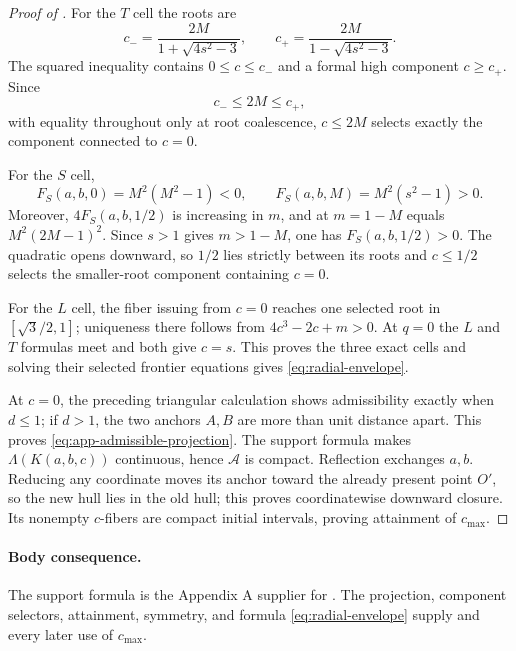 \begin{proof}[Proof of ]
For the $T$ cell the roots are
\[
 c_- =\frac{2M}{1+\sqrt{4s^2-3}},
 \qquad
 c_+ =\frac{2M}{1-\sqrt{4s^2-3}}.
\]
The squared inequality contains $0\le c\le c_-$ and a formal high component
$c\ge c_+$.  Since
\[
 c_-\le2M\le c_+,
\]
with equality throughout only at root coalescence, $c\le2M$ selects exactly
the component connected to $c=0$.

For the $S$ cell,
\[
 F_S(a,b,0)=M^2(M^2-1)<0,
 \qquad
 F_S(a,b,M)=M^2(s^2-1)>0.
\]
Moreover, $4F_S(a,b,1/2)$ is increasing in $m$, and at $m=1-M$ equals
$M^2(2M-1)^2$.  Since $s>1$ gives $m>1-M$, one has
$F_S(a,b,1/2)>0$.  The quadratic opens downward, so $1/2$ lies strictly
between its roots and $c\le1/2$ selects the smaller-root component containing
$c=0$.

For the $L$ cell, the fiber issuing from $c=0$ reaches one selected root in
$[\sqrt3/2,1]$; uniqueness there follows from
$4c^3-2c+m>0$.  At $q=0$ the $L$ and $T$ formulas meet and both give $c=s$.
This proves the three exact cells and solving their selected frontier
equations gives \eqref{eq:radial-envelope}.

At $c=0$, the preceding triangular calculation shows admissibility exactly
when $d\le1$; if $d>1$, the two anchors $A,B$ are more than unit distance
apart.  This proves \eqref{eq:app-admissible-projection}.  The support formula
makes $\Lambda(K(a,b,c))$ continuous, hence $\mathcal A$ is compact.
Reflection exchanges $a,b$.  Reducing any coordinate moves its anchor toward
the already present point $O'$, so the new hull lies in the old hull; this
proves coordinatewise downward closure.  Its nonempty $c$-fibers are compact
initial intervals, proving attainment of $c_{\max}$.
\end{proof}

\paragraph{Body consequence.}
The support formula is the Appendix A supplier for
.  The projection, component selectors,
attainment, symmetry, and formula \eqref{eq:radial-envelope} supply
 and every later use of
$c_{\max}$.

